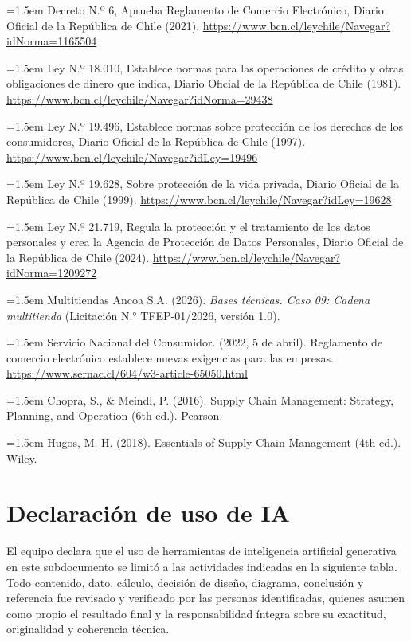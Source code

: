 \documentclass[11pt]{article}
\begin{document}
\noindent\hangindent=1.5em Decreto N.º 6, Aprueba Reglamento de Comercio Electrónico, Diario Oficial de la República de Chile (2021). \url{https://www.bcn.cl/leychile/Navegar?idNorma=1165504}

\noindent\hangindent=1.5em Ley N.º 18.010, Establece normas para las operaciones de crédito y otras obligaciones de dinero que indica, Diario Oficial de la República de Chile (1981). \url{https://www.bcn.cl/leychile/Navegar?idNorma=29438}

\noindent\hangindent=1.5em Ley N.º 19.496, Establece normas sobre protección de los derechos de los consumidores, Diario Oficial de la República de Chile (1997). \url{https://www.bcn.cl/leychile/Navegar?idLey=19496}

\noindent\hangindent=1.5em Ley N.º 19.628, Sobre protección de la vida privada, Diario Oficial de la República de Chile (1999). \url{https://www.bcn.cl/leychile/Navegar?idLey=19628}

\noindent\hangindent=1.5em Ley N.º 21.719, Regula la protección y el tratamiento de los datos personales y crea la Agencia de Protección de Datos Personales, Diario Oficial de la República de Chile (2024). \url{https://www.bcn.cl/leychile/Navegar?idNorma=1209272}

\noindent\hangindent=1.5em Multitiendas Ancoa S.A. (2026). \textit{Bases técnicas. Caso 09: Cadena multitienda} (Licitación N.° TFEP-01/2026, versión 1.0).

\noindent\hangindent=1.5em Servicio Nacional del Consumidor. (2022, 5 de abril). Reglamento de comercio electrónico establece nuevas exigencias para las empresas. \url{https://www.sernac.cl/604/w3-article-65050.html}

\noindent\hangindent=1.5em Chopra, S., \& Meindl, P. (2016). Supply Chain Management: Strategy, Planning, and Operation (6th ed.). Pearson.

\noindent\hangindent=1.5em Hugos, M. H. (2018). Essentials of Supply Chain Management (4th ed.). Wiley.

\section*{Declaración de uso de IA}

El equipo declara que el uso de herramientas de inteligencia artificial generativa en este subdocumento se limitó a las actividades indicadas en la siguiente tabla. Todo contenido, dato, cálculo, decisión de diseño, diagrama, conclusión y referencia fue revisado y verificado por las personas identificadas, quienes asumen como propio el resultado final y la responsabilidad íntegra sobre su exactitud, originalidad y coherencia técnica.
\end{document}
